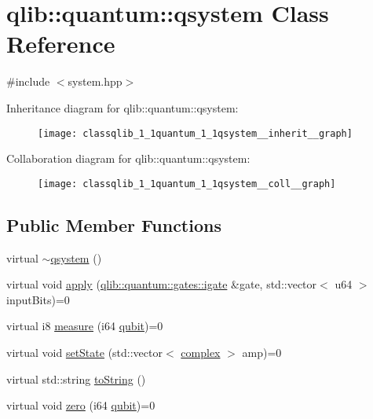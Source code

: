 \hypertarget{classqlib_1_1quantum_1_1qsystem}{}\section{qlib\+:\+:quantum\+:\+:qsystem Class Reference}
\label{classqlib_1_1quantum_1_1qsystem}


{\ttfamily \#include $<$system.\+hpp$>$}



Inheritance diagram for qlib\+:\+:quantum\+:\+:qsystem\+:\nopagebreak
\begin{figure}[H]
\begin{center}
\leavevmode
\texttt{[image: classqlib\_1\_1quantum\_1\_1qsystem\_\_inherit\_\_graph]}
\end{center}
\end{figure}


Collaboration diagram for qlib\+:\+:quantum\+:\+:qsystem\+:\nopagebreak
\begin{figure}[H]
\begin{center}
\leavevmode
\texttt{[image: classqlib\_1\_1quantum\_1\_1qsystem\_\_coll\_\_graph]}
\end{center}
\end{figure}
\subsection*{Public Member Functions}
\begin{DoxyCompactItemize}
\item 
virtual \hyperlink{classqlib_1_1quantum_1_1qsystem_aeb1ecc3086cd9c14756aa4c575eeda0c}{$\sim$qsystem} ()
\item 
virtual void \hyperlink{classqlib_1_1quantum_1_1qsystem_adbb748feb351aac69ca4a0bf6c92d77c}{apply} (\hyperlink{classqlib_1_1quantum_1_1gates_1_1igate}{qlib\+::quantum\+::gates\+::igate} \&gate, std\+::vector$<$ u64 $>$ input\+Bits)=0
\item 
virtual i8 \hyperlink{classqlib_1_1quantum_1_1qsystem_a33d9954c6ca01cb400d940ff05614364}{measure} (i64 \hyperlink{classqlib_1_1quantum_1_1qubit}{qubit})=0
\item 
virtual void \hyperlink{classqlib_1_1quantum_1_1qsystem_ab70360fa1be7b72d4f49f6dadc17267d}{set\+State} (std\+::vector$<$ \hyperlink{classqlib_1_1math_1_1complex}{complex} $>$ amp)=0
\item 
virtual std\+::string \hyperlink{classqlib_1_1quantum_1_1qsystem_a9d95030955e2fdb26bc9152c32310e7e}{to\+String} ()
\item 
virtual void \hyperlink{classqlib_1_1quantum_1_1qsystem_a5626857e5dc87dc2bdbb1f4d0b0401f9}{zero} (i64 \hyperlink{classqlib_1_1quantum_1_1qubit}{qubit})=0
\end{DoxyCompactItemize}


